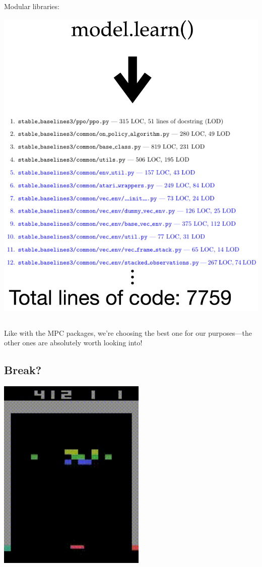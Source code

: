 \documentclass[
  letterpaper,
  DIV=11,
  numbers=noendperiod,
  oneside]{scrartcl}
\begin{document}
Modular libraries:

\includegraphics{figs/sb3_loc.png}

\subsection{}\label{section-38}

Like with the MPC packages, we're choosing the best one for our
purposes---the other ones are absolutely worth looking into!

\subsection{Break?}\label{break-2}

\begin{center}
\includegraphics[width=\textwidth,height=3.64583in]{videos/atari_breakout.gif}
\end{center}
\end{document}
